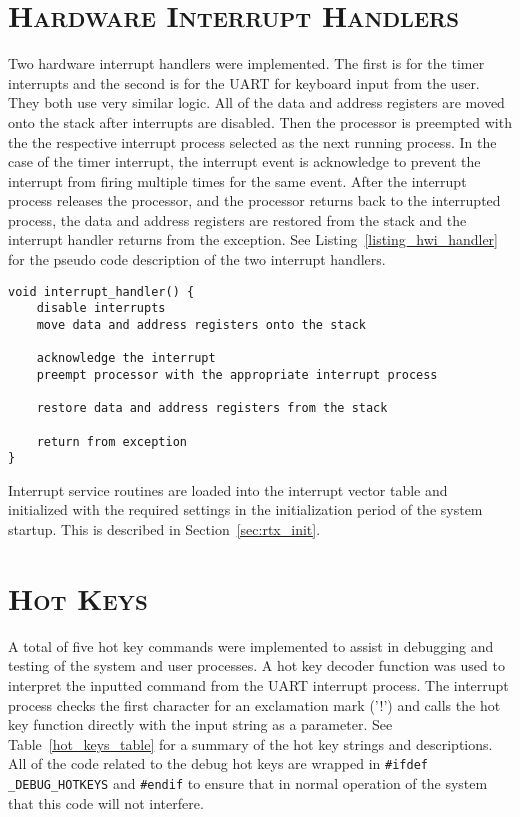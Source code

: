 \documentclass[oneside]{report}
\begin{document}
\section{\textsc{Hardware Interrupt Handlers}}
Two hardware interrupt handlers were implemented. The first is for the timer
interrupts and the second is for the UART for keyboard input from the user.
They both use very similar logic. All of the data and address registers are
moved onto the stack after interrupts are disabled. Then the processor is
preempted with the the respective interrupt process selected as the next
running process. In the case of the timer interrupt, the interrupt event is
acknowledge to prevent the interrupt from firing multiple times for the same
event. After the interrupt process releases the processor, and the processor
returns back to the interrupted process, the data and address registers are
restored from the stack and the interrupt handler returns from the exception.
See Listing~\ref{listing_hwi_handler} for the pseudo code description of the
two interrupt handlers.

\begin{lstlisting}
void interrupt_handler() {
    disable interrupts
    move data and address registers onto the stack

    acknowledge the interrupt
    preempt processor with the appropriate interrupt process

    restore data and address registers from the stack

    return from exception
}
\end{lstlisting}

Interrupt service routines are loaded into the interrupt vector table and
initialized with the required settings in the initialization period of the
system startup. This is described in Section~\ref{sec:rtx_init}.

\section{\textsc{Hot Keys}}

A total of five hot key commands were implemented to assist in debugging and
testing of the system and user processes. A hot key decoder function was used to
interpret the inputted command from the UART interrupt process. The interrupt
process checks the first character for an exclamation mark ('!') and calls the
hot key function directly with the input string as a parameter. See
Table~\ref{hot_keys_table} for a summary of the hot key strings and
descriptions. All of the code related to the debug hot keys are wrapped in
\texttt{\#ifdef \_DEBUG\_HOTKEYS} and \texttt{\#endif} to ensure that in normal
operation of the system that this code will not interfere.
\end{document}
